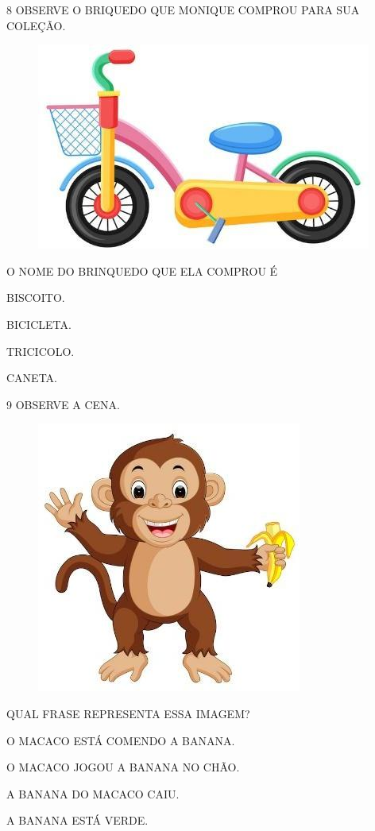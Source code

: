 \pagebreak

\num{8} OBSERVE O BRIQUEDO QUE MONIQUE COMPROU PARA SUA COLEÇÃO.

\begin{figure}[htpb]
\centering
\includegraphics[width=.3\textwidth]{media/image217.jpg}
\end{figure}

O NOME DO BRINQUEDO QUE ELA COMPROU É

\begin{escolha}
\item BISCOITO.

\item BICICLETA.

\item TRICICOLO.

\item CANETA.
\end{escolha}

\num{9} OBSERVE A CENA.

\begin{figure}[htpb]
\centering
\includegraphics[width=.3\textwidth]{media/image218.jpg}
\end{figure}

QUAL FRASE REPRESENTA ESSA IMAGEM?

\begin{escolha}
\item O MACACO ESTÁ COMENDO A BANANA.

\item O MACACO JOGOU A BANANA NO CHÃO.

\item A BANANA DO MACACO CAIU.

\item A BANANA ESTÁ VERDE.
\end{escolha}

